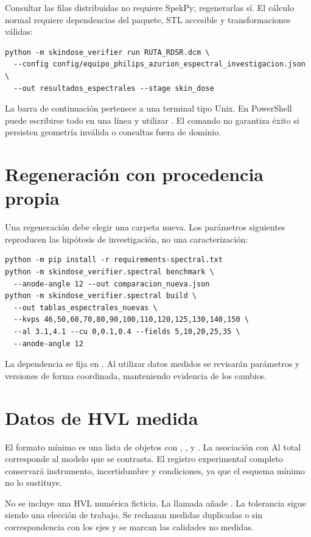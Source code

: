 Consultar las filas distribuidas no requiere SpekPy; regenerarlas sí. El cálculo normal requiere dependencias del paquete, STL accesible y transformaciones válidas:
\begin{lstlisting}
python -m skindose_verifier run RUTA_RDSR.dcm \
  --config config/equipo_philips_azurion_espectral_investigacion.json \
  --out resultados_espectrales --stage skin_dose
\end{lstlisting}
La barra de continuación pertenece a una terminal tipo Unix. En PowerShell puede escribirse todo en una línea y utilizar . El comando no garantiza éxito si persisten geometría inválida o consultas fuera de dominio.

\section{Regeneración con procedencia propia}
Una regeneración debe elegir una carpeta nueva. Los parámetros siguientes reproducen las hipótesis de investigación, no una caracterización:
\begin{lstlisting}
python -m pip install -r requirements-spectral.txt
python -m skindose_verifier.spectral benchmark \
  --anode-angle 12 --out comparacion_nueva.json
python -m skindose_verifier.spectral build \
  --out tablas_espectrales_nuevas \
  --kvps 46,50,60,70,80,90,100,110,120,125,130,140,150 \
  --al 3.1,4.1 --cu 0,0.1,0.4 --fields 5,10,20,25,35 \
  --anode-angle 12
\end{lstlisting}
La dependencia se fija en \codigo{spekpy==2.5.4}. Al utilizar datos medidos se revisarán parámetros y versiones de forma coordinada, manteniendo evidencia de los cambios.

\section{Datos de HVL medida}
El formato mínimo es una lista de objetos con , ,  y . La asociación con Al total corresponde al modelo que se contrasta. El registro experimental completo conservará instrumento, incertidumbre y condiciones, ya que el esquema mínimo no lo sustituye.

No se incluye una HVL numérica ficticia. La llamada añade . La tolerancia sigue siendo una elección de trabajo. Se rechazan medidas duplicadas o sin correspondencia con los ejes y se marcan las calidades no medidas.

